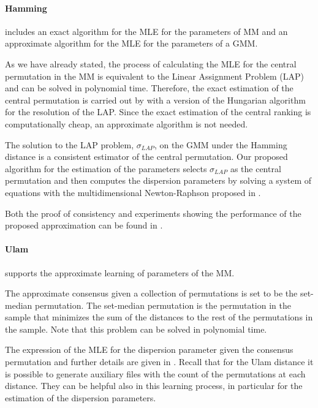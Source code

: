 \documentclass[article,nojss]{jss}
\begin{document}
\paragraph{Hamming}
 includes an exact algorithm for the MLE for the parameters of MM and an approximate algorithm for the MLE for the parameters of a GMM. 

As we have already stated, the process of calculating the MLE for the central permutation in the MM is equivalent to the Linear Assignment Problem (LAP) and can be solved in polynomial time. Therefore, the exact estimation of the central permutation is carried out by  with a version of the Hungarian algorithm for the resolution of the LAP. Since the exact estimation of the central ranking is computationally cheap, an approximate algorithm is not needed. 

The solution to the LAP problem, $\sigma_{LAP}$, on the GMM under the Hamming distance is a consistent estimator of the central permutation. Our proposed algorithm for the estimation of the parameters selects $\sigma_{LAP}$ as the central permutation and then computes the dispersion parameters by solving a system of equations with the multidimensional Newton-Raphson proposed in \cite{numerical_recipes_c}.

Both the proof of consistency and experiments showing the performance of the proposed approximation can be found in \cite{Irurozki2014a}.

\paragraph{Ulam}
 supports the approximate learning of parameters of the MM. 

The approximate consensus given a collection of permutations is set to be the set-median permutation. The set-median permutation is the permutation in the sample that minimizes the sum of the distances to the rest of the permutations in the sample. Note that this problem can be solved in polynomial time. 

The expression of the MLE for the dispersion parameter given the consensus permutation and further details are given in  \cite{Irurozki2014}.
Recall that for the Ulam distance it is possible to generate auxiliary files with the count of the permutations at each distance. They can be helpful also in this learning process, in particular for the estimation of the dispersion parameters.
\end{document}
